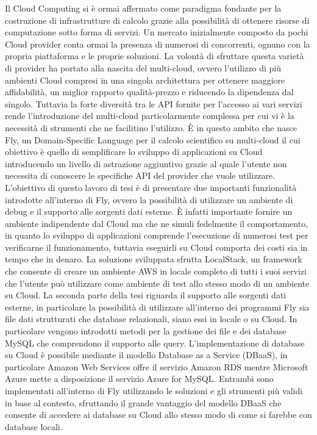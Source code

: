 Il Cloud Computing si è ormai affermato come paradigma fondante per la costruzione di infrastrutture di calcolo grazie alla possibilità di ottenere risorse di computazione sotto forma di servizi. Un mercato inizialmente composto da pochi Cloud provider conta ormai la presenza di numerosi di concorrenti, ognuno con la propria piattaforma e le proprie soluzioni. La volontà di sfruttare questa varietà di provider ha portato alla nascita del multi-cloud, ovvero l’utilizzo di più ambienti Cloud compresi in una singola architettura per ottenere maggiore affidabilità, un miglior rapporto qualità-prezzo e riducendo la dipendenza dal singolo. Tuttavia la forte diversità tra le API fornite per l'accesso ai vari servizi rende l'introduzione del multi-cloud particolarmente complessa per cui vi è la necessità di strumenti che ne facilitino l'utilizzo. È in questo ambito che nasce Fly, un Domain-Specific Language per il calcolo scientifico su multi-cloud il cui obiettivo è quello di semplificare lo sviluppo di applicazioni su Cloud introducendo un livello di astrazione aggiuntivo grazie al quale l'utente non necessita di conoscere le specifiche API del provider che vuole utilizzare. L'obiettivo di questo lavoro di tesi è di presentare due importanti funzionalità introdotte all'interno di Fly, ovvero la possibilità di utilizzare un ambiente di debug e il supporto alle sorgenti dati esterne. È infatti importante fornire un ambiente indipendente dal Cloud ma che ne simuli fedelmente il comportamento, in quanto lo sviluppo di applicazioni comprende l'esecuzione di numerosi test per verificarne il funzionamento, tuttavia eseguirli su Cloud comporta dei costi sia in tempo che in denaro. La soluzione sviluppata sfrutta LocalStack, un framework che consente di creare un ambiente AWS in locale completo di tutti i suoi servizi che l’utente può utilizzare come ambiente di test allo stesso modo di un ambiente su Cloud. La seconda parte della tesi riguarda il supporto alle sorgenti dati esterne, in particolare la possibilità di utilizzare all'interno dei programmi Fly sia file dati strutturati che database relazionali, siano essi in locale o su Cloud. In particolare vengono introdotti metodi per la gestione dei file e  dei database MySQL che comprendono il supporto alle query. L'implementazione di database su Cloud è possibile mediante il modello Database as a Service (DBaaS), in particolare Amazon Web Services offre il servizio Amazon RDS mentre Microsoft Azure mette a disposizione il servizio Azure for MySQL. Entrambi sono implementati all'interno di Fly utilizzando le soluzioni e gli strumenti più validi in base al contesto, sfruttando il grande vantaggio del modello DBaaS che consente di accedere ai database su Cloud allo stesso modo di come si farebbe con database locali.